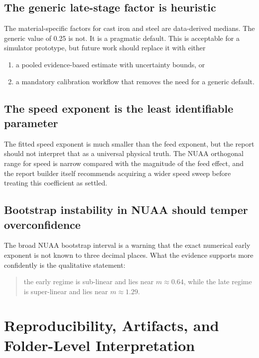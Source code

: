 \documentclass[11pt,a4paper]{article}
\begin{document}
\subsection{The generic late-stage factor is heuristic}

The material-specific factors for cast iron and steel are data-derived medians. The generic value of \num{0.25} is not.
It is a pragmatic default. This is acceptable for a simulator prototype, but future work should replace it with either
\begin{enumerate}[leftmargin=1.8em]
\item a pooled evidence-based estimate with uncertainty bounds, or
\item a mandatory calibration workflow that removes the need for a generic default.
\end{enumerate}

\subsection{The speed exponent is the least identifiable parameter}

The fitted speed exponent is much smaller than the feed exponent, but the report should not interpret that as a universal
physical truth. The NUAA orthogonal range for speed is narrow compared with the magnitude of the feed effect, and the report
builder itself recommends acquiring a wider speed sweep before treating this coefficient as settled.

\subsection{Bootstrap instability in NUAA should temper overconfidence}

The broad NUAA bootstrap interval is a warning that the exact numerical early exponent is not known to three decimal places.
What the evidence supports more confidently is the qualitative statement:

\begin{quote}
the early regime is sub-linear and lies near \(m \approx 0.64\), while the late regime is super-linear and lies near \(m \approx 1.29\).
\end{quote}

\section{Reproducibility, Artifacts, and Folder-Level Interpretation}
\end{document}
